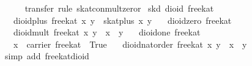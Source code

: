 \begin{isabellebody}
\ \ \ \ \isamarkupfalse%
\ {}transfer{}\ rule\ skat{}con{}mult{}zeror{}\isanewline
{}\isamarkupfalse%
%
\endisatagproof
{\isafoldproof}%
%
\isadelimproof
\isanewline
%
\endisadelimproof
\isanewline
{}\isamarkupfalse%
\ skd{}\ dioid\ free{}kat\isanewline
\ \ \ {}dioid{}plus\ free{}kat\ x\ y\ {}\ skat{}plus\ x\ y{}\isanewline
\ \ \ {}dioid{}zero\ free{}kat\ {}\ {}{}\isanewline
\ \ \ {}dioid{}mult\ free{}kat\ x\ y\ {}\ x\ {}\ y{}\isanewline
\ \ \ {}dioid{}one\ free{}kat\ {}\ {}{}\isanewline
\ \ \ {}x\ {}\ carrier\ free{}kat\ {}\ True{}\isanewline
\ \ \ {}dioid{}nat{}order\ free{}kat\ x\ y\ {}\ {}x\ {}\ y{}{}\isanewline
%
\isadelimproof
\ \ %
\endisadelimproof
%
\isatagproof
{}\isamarkupfalse%
\ {}simp\ add{}\ free{}kat{}dioid{}\isanewline

\end{isabellebody}
